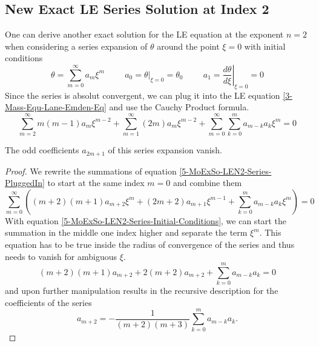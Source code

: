 \begin{appendix}
\begin{section}
\subsection{New Exact LE Series Solution at Index 2}
One can derive another exact solution for the LE equation at the exponent $n=2$ when 
considering a series expansion of $\theta$ around the point $\xi=0$ with initial conditions
\begin{equation}
	\theta=\sum\limits_{m=0}^\infty a_m\xi^m \hspace{1cm} a_0=\left.\theta\right|_{\xi=0}=\theta_0 
	\hspace{1cm} a_1=\left.\frac{d\theta}{d\xi}\right|_{\xi=0}=0
	\label{5-MoExSo-LEN2-Series-Initial-Conditions}
\end{equation}
Since the series is absolut convergent, we can plug it into the LE equation \ref{3-Mass-Equ-Lane-Emden-Eq} and use the Cauchy Product formula.
\begin{equation}
	\sum\limits_{m=2}^\infty m(m-1)a_m\xi^{m-2}+\sum\limits_{m=1}^\infty (2m)a_m\xi^{m-2} + 
	\sum\limits_{m=0}^\infty\sum\limits_{k=0}^m a_{m-k}a_k\xi^m = 0
	\label{5-MoExSo-LEN2-Series-PluggedIn}
\end{equation}
\begin{theorem}
	The odd coefficients $a_{2m+1}$ of this series expansion vanish.
\end{theorem}
\begin{proof}
	We rewrite the summations of equation \ref{5-MoExSo-LEN2-Series-PluggedIn} to start at the 
	same index $m=0$ and combine them
	\begin{equation}
		\sum\limits_{m=0}^\infty\left((m+2)(m+1)a_{m+2}\xi^{m}+(2m+2)a_{m+1}\xi^{m-1} + 
		\sum\limits_{k=0}^m a_{m-k}a_k\xi^m\right) = 0
	\end{equation}
	With equation \ref{5-MoExSo-LEN2-Series-Initial-Conditions}, we can start the summation 
	in the middle one index higher and separate the term $\xi^m$. This equation has to be true 
	inside the radius of convergence of the series and thus needs to vanish for ambiguous $\xi$.
	\begin{equation}
		(m+2)(m+1)a_{m+2}+2(m+2)a_{m+2}+\sum\limits_{k=0}^ma_{m-k}a_k = 0
	\end{equation}
	and upon further manipulation results in the recursive description for the coefficients 
	of the series
	\begin{equation}
		a_{m+2} = -\frac{1}{(m+2)(m+3)}\sum\limits_{k=0}^ma_{m-k}a_k.
		\label{5-MoExSo-LEN2-Recursive-Coefficients}
	\end{equation}

\end{proof}
\end{section}
\end{appendix}

